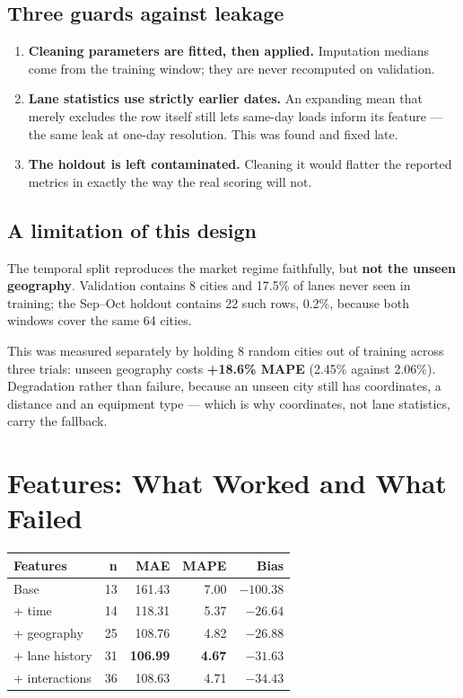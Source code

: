 \documentclass[11pt,a4paper]{article}
\newcommand{\key}[1]{\textbf{\color{spotter}#1}}
\begin{document}
\subsection{Three guards against leakage}

\begin{enumerate}\itemsep2pt
\item \textbf{Cleaning parameters are fitted, then applied.} Imputation medians
come from the training window; they are never recomputed on validation.
\item \textbf{Lane statistics use strictly earlier dates.} An expanding mean that
merely excludes the row itself still lets same-day loads inform its feature ---
the same leak at one-day resolution. This was found and fixed late.
\item \textbf{The holdout is left contaminated.} Cleaning it would flatter the
reported metrics in exactly the way the real scoring will not.
\end{enumerate}

\subsection{A limitation of this design}

The temporal split reproduces the market regime faithfully, but \key{not the
unseen geography}. Validation contains 8 cities and 17.5\% of lanes never seen in
training; the Sep--Oct holdout contains 22 such rows, 0.2\%, because both windows
cover the same 64 cities.

This was measured separately by holding 8 random cities out of training across
three trials: unseen geography costs \key{+18.6\% MAPE} (2.45\% against 2.06\%).
Degradation rather than failure, because an unseen city still has coordinates, a
distance and an equipment type --- which is why coordinates, not lane statistics,
carry the fallback.

\section{Features: What Worked and What Failed}

\begin{center}
\small
\begin{tabular}{@{}lrrrr@{}}
\toprule
\textbf{Features} & \textbf{n} & \textbf{MAE} & \textbf{MAPE} & \textbf{Bias}\\
\midrule
Base & 13 & 161.43 & 7.00 & $-100.38$\\
+ time & 14 & 118.31 & 5.37 & $-26.64$\\
+ geography & 25 & 108.76 & 4.82 & $-26.88$\\
+ lane history & 31 & \key{106.99} & \key{4.67} & $-31.63$\\
+ interactions & 36 & 108.63 & 4.71 & $-34.43$\\
\bottomrule
\end{tabular}
\end{center}
\end{document}
